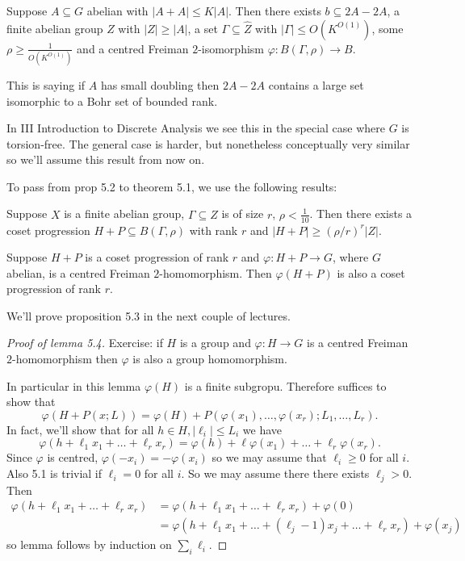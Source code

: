 \documentclass[a4paper]{article}
\begin{document}
\begin{proposition}
  Suppose \(A \subseteq G\) abelian with \(|A + A| \leq K|A|\). Then there exists \(b \subseteq 2A - 2A\), a finite abelian group \(Z\) with \(|Z| \geq |A|\), a set \(\Gamma \subseteq \hat Z\) with \(|\Gamma| \leq O(K^{O(1)})\), some \(\rho \geq \frac{1}{O(K^{O(1)})}\) and a centred Freiman \(2\)-isomorphism \(\varphi: B(\Gamma, \rho) \to B\).
\end{proposition}

This is saying if \(A\) has small doubling then \(2A - 2A\) contains a large set isomorphic to a Bohr set of bounded rank.

In III Introduction to Discrete Analysis we see this in the special case where \(G\) is torsion-free. The general case is harder, but nonetheless conceptually very similar so we'll assume this result from now on.

To pass from prop 5.2 to theorem 5.1, we use the following results:

\begin{proposition}[prop 5.3]
  Suppose \(X\) is a finite abelian group, \(\Gamma \subseteq \hat Z\) is of size \(r\), \(\rho < \frac{1}{10}\). Then there exists a coset progression \(H + P \subseteq B(\Gamma, \rho)\) with rank \(r\) and \(|H + P| \geq (\rho/r)^r |Z|\).
\end{proposition}

\begin{lemma}[lemma 5.4]
  Suppose \(H + P\) is a coset progression of rank \(r\) and \(\varphi: H + P \to G\), where \(G\) abelian, is a centred Freiman \(2\)-homomorphism. Then \(\varphi(H + P)\) is also a coset progression of rank \(r\).
\end{lemma}

We'll prove proposition 5.3 in the next couple of lectures.

\begin{proof}[Proof of lemma 5.4]
  Exercise: if \(H\) is a group and \(\varphi: H \to G\) is a centred Freiman \(2\)-homomorphism then \(\varphi\) is also a group homomorphism.

  In particular in this lemma \(\varphi(H)\) is a finite subgropu. Therefore suffices to show that
  \[
    \varphi(H + P(x; L)) = \varphi(H) + P(\varphi(x_1), \dots, \varphi(x_r); L_1, \dots, L_r).
  \]
  In fact, we'll show that for all \(h \in H, |\ell_i| \leq L_i\) we have
  \[
    \varphi(h + \ell_1 x_1 + \dots + \ell_r x_r) = \varphi(h) + \ell \varphi(x_1) + \dots + \ell_r \varphi(x_r).
    \tag{5.1}
  \]
  Since \(\varphi\) is centred, \(\varphi(-x_i) = - \varphi(x_i)\) so we may assume that \(\ell_i \geq 0\) for all \(i\). Also 5.1 is trivial if \(\ell_i = 0\) for all \(i\). So we may assume there there exists \(\ell_j > 0\). Then
  \begin{align*}
    \varphi(h + \ell_1 x_1 + \dots + \ell_r x_r)
    &= \varphi(h + \ell_1x_1 + \dots + \ell_r x_r) + \varphi(0) \\
    &= \varphi(h + \ell_1x_1 + \dots + (\ell_j - 1) x_j + \dots + \ell_rx_r) + \varphi(x_j)
  \end{align*}
  so lemma follows by induction on \(\sum_i \ell_i\).
\end{proof}
\end{document}
